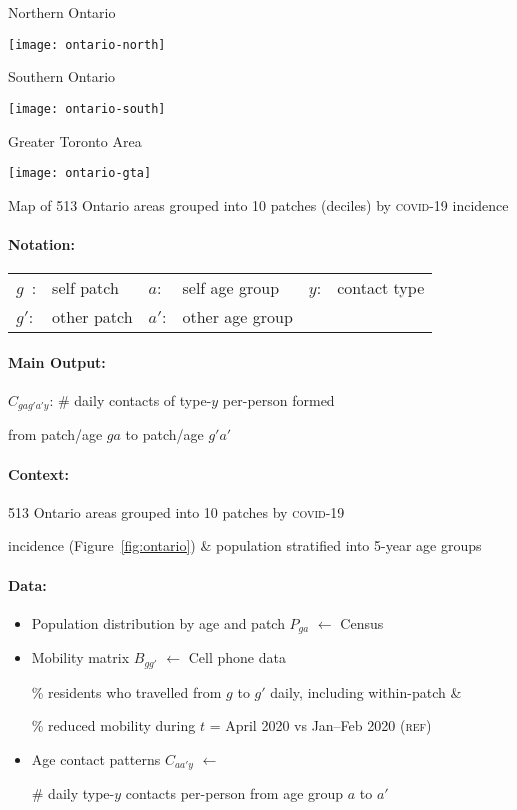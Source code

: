 \begin{fig}{\linewidth}\unskip
  \newcommand{\greytitle}[1]{\centering\footnotesize{\color{black!40!white}#1}\bigskip\par}
  \begin{minipage}[t]{0.30\linewidth}
    \greytitle{Northern Ontario}
    \texttt{[image: ontario-north]}
  \end{minipage}\hfill%
  \begin{minipage}[t]{0.32\linewidth}
    \greytitle{Southern Ontario}
    \texttt{[image: ontario-south]}
  \end{minipage}%
  \begin{minipage}[t]{0.36\linewidth}
    \greytitle{Greater Toronto Area}
    \texttt{[image: ontario-gta]}
  \end{minipage}
  \caption{Map of 513 Ontario areas grouped into 10 patches (deciles)
    by \textsc{covid-19} incidence}
  \label{fig:ontario}
\end{fig}
\medskip\par
\paragraph{Notation:}
\begin{tabular}[t]{llllll}
  $g$~: & self patch  & $a$:  & self age group  & $y$: & contact type \\
  $g'$: & other patch & $a'$: & other age group &      &
\end{tabular}
\paragraph{Main Output:} $C_{gag'a'y}$: \# daily contacts of type-$y$ per-person formed
\par\indent from patch/age $ga$ to patch/age $g'a'$
\paragraph{Context:}
513 Ontario areas grouped into 10 patches by \textsc{covid-19}
\par\indent incidence (Figure~\ref{fig:ontario}) \& population stratified into 5-year age groups
\paragraph{Data:}
\begin{itemize}
  \item Population distribution by age and patch $P_{ga}$ $\leftarrow$ Census \cite{StatsCan2016}
  \item Mobility matrix $B_{gg'}$ $\leftarrow$ Cell phone data \cite{Ghasemi2021}\par
  \% residents who travelled from $g$ to $g'$ daily, including within-patch \&\par
  \% reduced mobility during $t$ = April 2020 vs Jan--Feb 2020 (\textsc{ref})
  \item Age contact patterns $C_{aa'y}$ $\leftarrow$ \citet{Prem2021}\par
  \# daily type-$y$ contacts per-person from age group $a$ to $a'$
\end{itemize}
